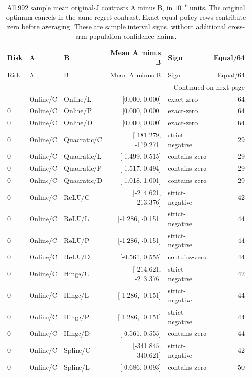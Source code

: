 \begingroup
\scriptsize
\setlength{\tabcolsep}{3pt}
\begin{longtable}{lllrlr}
\caption{All 992 sample mean original-J contrasts A minus B, in $10^{-6}$ units. The original optimum cancels in the same regret contrast. Exact equal-policy rows contribute zero before averaging. These are sample interval signs, without additional cross-arm population confidence claims.}\label{tab:allcontrasts120}\\
\toprule
Risk & A & B & Mean A minus B & Sign & Equal/64 \\ \midrule
\endfirsthead
\toprule
Risk & A & B & Mean A minus B & Sign & Equal/64 \\ \midrule
\endhead
\midrule\multicolumn{6}{r}{Continued on next page}\\\endfoot
\bottomrule\endlastfoot
0 & Online/C & Online/L & [0.000, 0.000] & exact-zero & 64 \\
0 & Online/C & Online/P & [0.000, 0.000] & exact-zero & 64 \\
0 & Online/C & Online/D & [0.000, 0.000] & exact-zero & 64 \\
0 & Online/C & Quadratic/C & [-181.279, -179.271] & strict-negative & 29 \\
0 & Online/C & Quadratic/L & [-1.499, 0.515] & contains-zero & 29 \\
0 & Online/C & Quadratic/P & [-1.517, 0.494] & contains-zero & 29 \\
0 & Online/C & Quadratic/D & [-1.018, 1.001] & contains-zero & 29 \\
0 & Online/C & ReLU/C & [-214.621, -213.376] & strict-negative & 42 \\
0 & Online/C & ReLU/L & [-1.286, -0.151] & strict-negative & 44 \\
0 & Online/C & ReLU/P & [-1.286, -0.151] & strict-negative & 44 \\
0 & Online/C & ReLU/D & [-0.561, 0.555] & contains-zero & 44 \\
0 & Online/C & Hinge/C & [-214.621, -213.376] & strict-negative & 42 \\
0 & Online/C & Hinge/L & [-1.286, -0.151] & strict-negative & 44 \\
0 & Online/C & Hinge/P & [-1.286, -0.151] & strict-negative & 44 \\
0 & Online/C & Hinge/D & [-0.561, 0.555] & contains-zero & 44 \\
0 & Online/C & Spline/C & [-341.845, -340.621] & strict-negative & 42 \\
0 & Online/C & Spline/L & [-0.686, 0.093] & contains-zero & 50 \\

\end{longtable}
